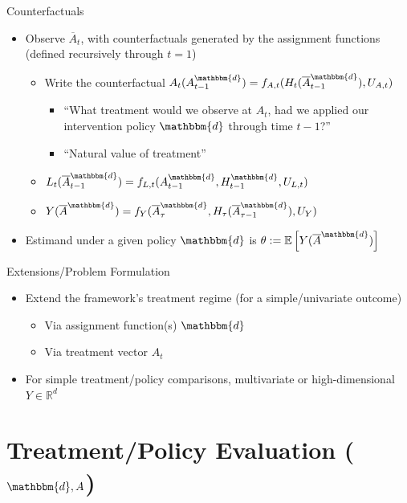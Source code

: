 \documentclass{beamer}
\newcommand{\EE}{\mathbb{E}}
\newcommand{\Abar}{\overline{A}}
\newcommand{\subitem}[1]{\begin{itemize} \item #1 \end{itemize}}
\newcommand{\widesubitem}[2]{\begin{itemize} \item #1 \end{itemize} \vspace{#2}}
\newcommand{\RR}{\mathbb{R}}
\newcommand{\assign}{\mathbbm{d}}
\begin{document}
\begin{frame}{Counterfactuals}
    \begin{itemize}

    \item Observe $\Abar_t$, with counterfactuals generated by the assignment functions (defined recursively through $t=1$)

        \widesubitem{Write the counterfactual $A_t(A^\assign_{t-1}) = f_{A,t}(H_t(\Abar_{t-1}^\assign), U_{A,t})$
            \subitem{``What treatment would we observe at $A_t$, had we applied our intervention policy $\assign$ through time $t-1$?''}
            \subitem{``Natural value of treatment''}
        }{0.3em}

        \widesubitem{$L_t(\Abar^\assign_{t-1}) = f_{L,t}(A_{t-1}^\assign, H_{t-1}^\assign, U_{L,t})$}{0.3em}

        \widesubitem{$Y(\Abar^\assign) = f_Y(\Abar_\tau^\assign, H_\tau(\Abar_{\tau-1}^\assign), U_Y)$}{0.3em}

    \item Estimand under a given policy $\assign$ is $\theta := \EE\left[ Y(\Abar^\assign) \right]$

    \end{itemize}
\end{frame}



\begin{frame}{Extensions/Problem Formulation}
    \begin{itemize}\setlength\itemsep{1.5em}
        \item Extend the framework's treatment regime (for a simple/univariate outcome)
        \widesubitem{Via assignment function(s) $\assign$}{1em}
        \widesubitem{Via treatment vector $A_t$}{1em}

        \item For simple treatment/policy comparisons, multivariate or high-dimensional $Y\in\RR^d$ 
    \end{itemize}
\end{frame}

\section{Treatment/Policy Evaluation ($\assign, A$)}
\end{document}
